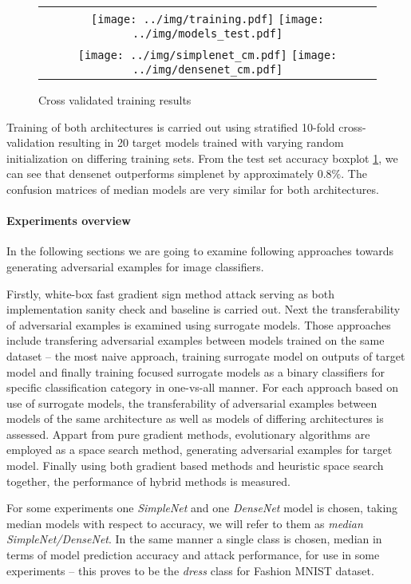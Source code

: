 \begin{figure}
\centering
\begin{tabular}{@{}c@{}}
    \texttt{[image: ../img/training.pdf]}
    \texttt{[image: ../img/models\_test.pdf]} \\
    \texttt{[image: ../img/simplenet\_cm.pdf]}
    \texttt{[image: ../img/densenet\_cm.pdf]}  \\
\end{tabular}
\caption{Cross validated training results}
\label{fig:training}
\end{figure}

Training of both architectures is carried out using stratified 10-fold cross-validation resulting in 20 target models trained with varying random initialization on differing training sets. From the test set accuracy boxplot \ref{fig:training}, we can see that densenet outperforms simplenet by approximately $0.8\%$. The confusion matrices of median models are very similar for both architectures.

\paragraph{Experiments overview}

In the following sections we are going to examine following approaches towards generating adversarial examples for image classifiers.

Firstly, white-box fast gradient sign method attack serving as both implementation sanity check and baseline is carried out. Next the transferability of adversarial examples is examined using surrogate models. Those approaches include transfering adversarial examples between models trained on the same dataset -- the most naive approach, training surrogate model on outputs of target model and finally training focused surrogate models as a binary classifiers for specific classification category in one-vs-all manner. For each approach based on use of surrogate models, the transferability of adversarial examples between models of the same architecture as well as models of differing architectures is assessed. Appart from pure gradient methods, evolutionary algorithms are employed as a space search method, generating adversarial examples for target model. Finally using both gradient based methods and heuristic space search together, the performance of hybrid methods is measured.

For some experiments one \textit{SimpleNet} and one \textit{DenseNet} model is chosen, taking median models with respect to accuracy, we will refer to them as \textit{median SimpleNet/DenseNet}. In the same manner a single class is chosen, median in terms of model prediction accuracy and attack performance, for use in some experiments -- this proves to be the \textit{dress} class for Fashion MNIST dataset.

